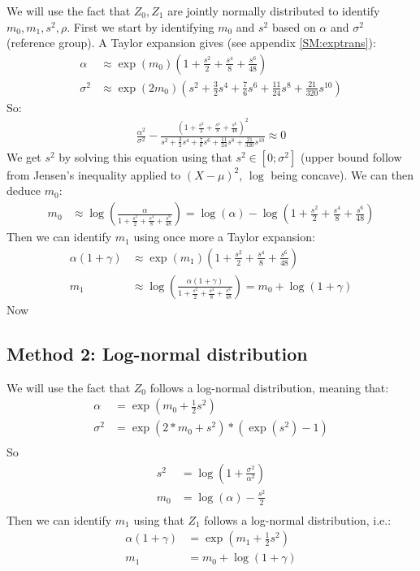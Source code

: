 \documentclass[12pt]{article}
\begin{document}
We will use the fact that \(Z_0,Z_1\) are jointly normally distributed
to identify \(m_0,m_1,s^2,\rho\). First we start by identifying
\(m_0\) and \(s^2\) based on \(\alpha\) and \(\sigma^2\) (reference
group). A Taylor expansion gives (see appendix \ref{SM:exptrans}):
\begin{align*}
\alpha &\approx \exp(m_0)\left(1 + \frac{s^2}{2}+\frac{s^4}{8}+\frac{s^6}{48}\right) \\
\sigma^2 &\approx \exp(2 m_0)\left(s^2 + \frac{3}{2} s^4 + \frac{7}{6} s^6 + \frac{11}{24} s^8 + \frac{21}{320} s^{10}\right)
\end{align*}
So:
\begin{align*}
\frac{\alpha^2}{\sigma^2} - \frac{\left(1 + \frac{s^2}{2}+\frac{s^4}{8}+\frac{s^6}{48}\right)^2}{s^2 + \frac{3}{2} s^4 + \frac{7}{6} s^6 + \frac{11}{24} s^8 + \frac{21}{320} s^{10}} \approx 0
\end{align*}
We get \(s^2\) by solving this equation using that \(s^2 \in
[0;\sigma^2]\) (upper bound follow from Jensen's inequality applied to
\((X-\mu)^2\), \(\log\) being concave). We can then deduce \(m_0\):
\begin{align*}
m_0  &\approx \log\left(\frac{\alpha}{1 + \frac{s^2}{2}+\frac{s^4}{8}+\frac{s^6}{48}}\right) = \log(\alpha) - \log\left(1 + \frac{s^2}{2}+\frac{s^4}{8}+\frac{s^6}{48}\right)
\end{align*}
Then we can identify \(m_1\) using once more a Taylor expansion:
\begin{align*}
\alpha(1+\gamma) &\approx \exp(m_1)\left(1 + \frac{s^2}{2}+\frac{s^4}{8}+\frac{s^6}{48}\right) \\
m_1 &\approx \log\left(\frac{\alpha(1+\gamma)}{1 + \frac{s^2}{2}+\frac{s^4}{8}+\frac{s^6}{48}}\right) = m_0 + \log(1+\gamma)
\end{align*}
Now

\subsection{Method 2: Log-normal distribution}
\label{sec:org70137c0}
We will use the fact that \(Z_0\) follows a log-normal distribution,
meaning that:
\begin{align*}
\alpha &= \exp(m_0 + \frac{1}{2} s^2) \\
\sigma^2 &= \exp(2*m_0 + s^2)*(\exp(s^2)-1) \\
\end{align*}
So
\begin{align*}
s^2 &= \log\left(1+\frac{\sigma^2}{\alpha^2}\right)\\
m_0 &= \log(\alpha)-\frac{s^2}{2}\\
\end{align*}
Then we can identify \(m_1\) using that \(Z_1\) follows a log-normal distribution, i.e.:
\begin{align*}
\alpha(1+\gamma) &= \exp(m_1 + \frac{1}{2} s^2) \\
m_1 &= m_0+\log(1+\gamma)\\
\end{align*}
\end{document}
